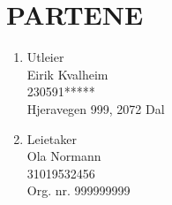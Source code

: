 \section{PARTENE} \label{Sec: PARTENE}


    \begin{enumerate}


        \item Utleier\\Eirik Kvalheim\\230591*****\\Hjeravegen 999, 2072 Dal

        \item Leietaker\\Ola Normann\\31019532456\\Org. nr. 999999999


    \end{enumerate}
